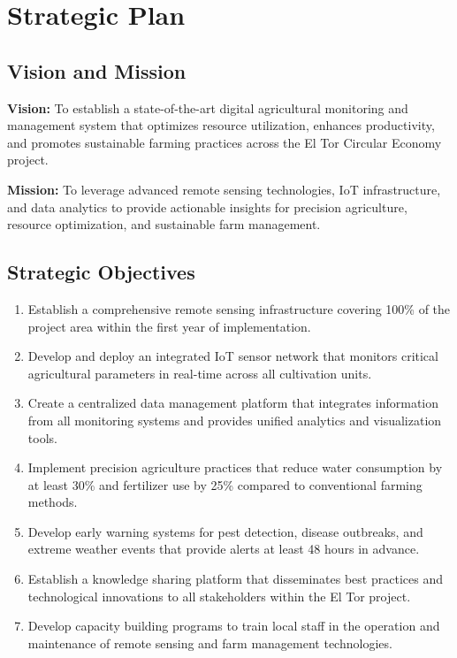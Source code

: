 \section{Strategic Plan}

\subsection{Vision and Mission}
\textbf{Vision:} To establish a state-of-the-art digital agricultural monitoring and management system that optimizes resource utilization, enhances productivity, and promotes sustainable farming practices across the El Tor Circular Economy project.

\textbf{Mission:} To leverage advanced remote sensing technologies, IoT infrastructure, and data analytics to provide actionable insights for precision agriculture, resource optimization, and sustainable farm management.

\subsection{Strategic Objectives}
\begin{enumerate}
    \item Establish a comprehensive remote sensing infrastructure covering 100\% of the project area within the first year of implementation.
    
    \item Develop and deploy an integrated IoT sensor network that monitors critical agricultural parameters in real-time across all cultivation units.
    
    \item Create a centralized data management platform that integrates information from all monitoring systems and provides unified analytics and visualization tools.
    
    \item Implement precision agriculture practices that reduce water consumption by at least 30\% and fertilizer use by 25\% compared to conventional farming methods.
    
    \item Develop early warning systems for pest detection, disease outbreaks, and extreme weather events that provide alerts at least 48 hours in advance.
    
    \item Establish a knowledge sharing platform that disseminates best practices and technological innovations to all stakeholders within the El Tor project.
    
    \item Develop capacity building programs to train local staff in the operation and maintenance of remote sensing and farm management technologies.
\end{enumerate}

